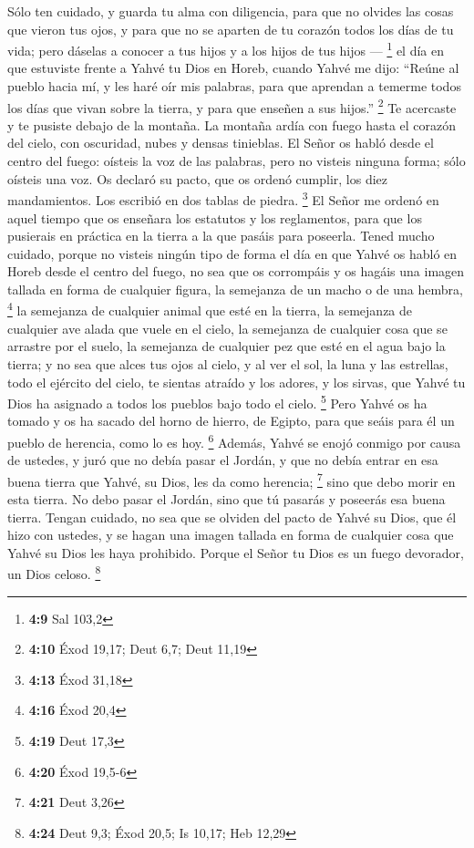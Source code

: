 \begin{paracol}{2}
 Sólo ten cuidado, y guarda tu alma con diligencia, para
que no olvides las cosas que vieron tus ojos, y para que no se aparten
de tu corazón todos los días de tu vida; pero dáselas a conocer a tus
hijos y a los hijos de tus hijos --- \footnote{\textbf{4:9} Sal 103,2}
 el día en que estuviste frente a Yahvé tu Dios en Horeb,
cuando Yahvé me dijo: ``Reúne al pueblo hacia mí, y les haré oír mis
palabras, para que aprendan a temerme todos los días que vivan sobre la
tierra, y para que enseñen a sus hijos.'' \footnote{\textbf{4:10} Éxod
  19,17; Deut 6,7; Deut 11,19}  Te acercaste y te pusiste
debajo de la montaña. La montaña ardía con fuego hasta el corazón del
cielo, con oscuridad, nubes y densas tinieblas.  El Señor
os habló desde el centro del fuego: oísteis la voz de las palabras, pero
no visteis ninguna forma; sólo oísteis una voz.  Os
declaró su pacto, que os ordenó cumplir, los diez mandamientos. Los
escribió en dos tablas de piedra. \footnote{\textbf{4:13} Éxod 31,18}
 El Señor me ordenó en aquel tiempo que os enseñara los
estatutos y los reglamentos, para que los pusierais en práctica en la
tierra a la que pasáis para poseerla.  Tened mucho
cuidado, porque no visteis ningún tipo de forma el día en que Yahvé os
habló en Horeb desde el centro del fuego,  no sea que os
corrompáis y os hagáis una imagen tallada en forma de cualquier figura,
la semejanza de un macho o de una hembra, \footnote{\textbf{4:16} Éxod
  20,4}  la semejanza de cualquier animal que esté en la
tierra, la semejanza de cualquier ave alada que vuele en el cielo,
 la semejanza de cualquier cosa que se arrastre por el
suelo, la semejanza de cualquier pez que esté en el agua bajo la tierra;
 y no sea que alces tus ojos al cielo, y al ver el sol,
la luna y las estrellas, todo el ejército del cielo, te sientas atraído
y los adores, y los sirvas, que Yahvé tu Dios ha asignado a todos los
pueblos bajo todo el cielo. \footnote{\textbf{4:19} Deut 17,3}
 Pero Yahvé os ha tomado y os ha sacado del horno de
hierro, de Egipto, para que seáis para él un pueblo de herencia, como lo
es hoy. \footnote{\textbf{4:20} Éxod 19,5-6}  Además,
Yahvé se enojó conmigo por causa de ustedes, y juró que no debía pasar
el Jordán, y que no debía entrar en esa buena tierra que Yahvé, su Dios,
les da como herencia; \footnote{\textbf{4:21} Deut 3,26} 
sino que debo morir en esta tierra. No debo pasar el Jordán, sino que tú
pasarás y poseerás esa buena tierra.  Tengan cuidado, no
sea que se olviden del pacto de Yahvé su Dios, que él hizo con ustedes,
y se hagan una imagen tallada en forma de cualquier cosa que Yahvé su
Dios les haya prohibido.  Porque el Señor tu Dios es un
fuego devorador, un Dios celoso. \footnote{\textbf{4:24} Deut 9,3; Éxod
  20,5; Is 10,17; Heb 12,29}


\end{paracol}
